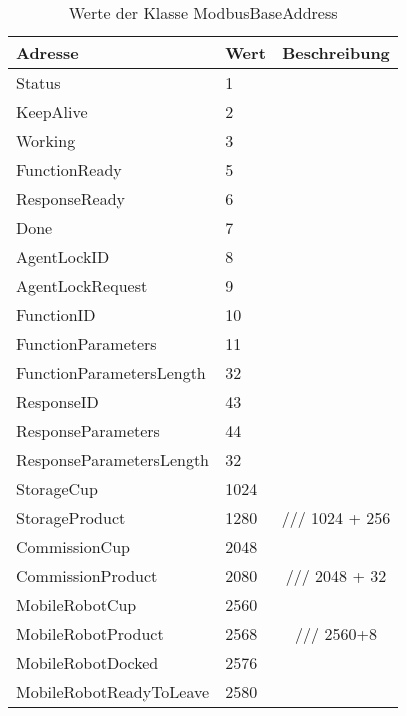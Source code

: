\begin{table}[h]
\centering
\caption{Werte der Klasse ModbusBaseAddress}
\begin{tabular}{|l|l|c|}
\hline
Adresse & Wert & Beschreibung \\
\hline
Status & 1 & \\
\hline
KeepAlive & 2 &\\
\hline
Working & 3 &\\
\hline
FunctionReady & 5 &\\
\hline
ResponseReady & 6 &\\
\hline
Done & 7 &\\
\hline
AgentLockID & 8 &\\
\hline
AgentLockRequest & 9 &\\
\hline
FunctionID & 10 &\\
\hline
FunctionParameters & 11 &\\
\hline
FunctionParametersLength & 32 &\\
\hline
ResponseID & 43 &\\
\hline
ResponseParameters & 44 &\\
\hline
ResponseParametersLength & 32 &\\
\hline
StorageCup & 1024 &\\
\hline
StorageProduct & 1280& /// 1024 + 256\\
\hline
CommissionCup & 2048 &\\
\hline
CommissionProduct & 2080 & /// 2048 + 32\\
\hline
MobileRobotCup & 2560 &\\
\hline
MobileRobotProduct & 2568 & /// 2560+8\\
\hline
MobileRobotDocked & 2576 &\\
\hline
MobileRobotReadyToLeave & 2580 &\\
\hline
\end{tabular}\label{tab:ModbusBase}
\end{table}


